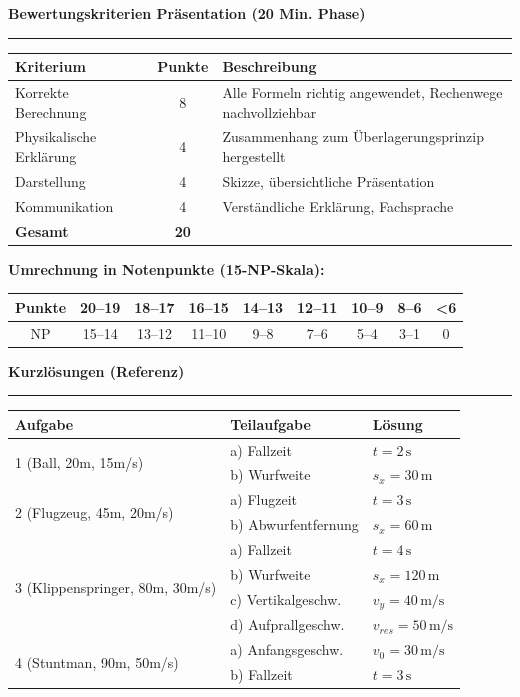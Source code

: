 \documentclass[11pt, a4paper]{article}
\newcommand{\fachfarbe}{physik}
\newcommand{\abschnitt}[1]{%
    \vspace{12pt}
    \noindent\textbf{\large\textcolor{\fachfarbe}{#1}}
    \vspace{6pt}
    \hrule
    \vspace{8pt}
}
\begin{document}

\abschnitt{Bewertungskriterien Präsentation (20 Min. Phase)}

\begin{tabular}{|p{4cm}|c|p{7cm}|}
\hline
\textbf{Kriterium} & \textbf{Punkte} & \textbf{Beschreibung} \\
\hline
Korrekte Berechnung & 8 & Alle Formeln richtig angewendet, Rechenwege nachvollziehbar \\
\hline
Physikalische Erklärung & 4 & Zusammenhang zum Überlagerungsprinzip hergestellt \\
\hline
Darstellung & 4 & Skizze, übersichtliche Präsentation \\
\hline
Kommunikation & 4 & Verständliche Erklärung, Fachsprache \\
\hline
\textbf{Gesamt} & \textbf{20} & \\
\hline
\end{tabular}

\vspace{8pt}

\textbf{Umrechnung in Notenpunkte (15-NP-Skala):}

\begin{tabular}{|c|c|c|c|c|c|c|c|c|}
\hline
Punkte & 20--19 & 18--17 & 16--15 & 14--13 & 12--11 & 10--9 & 8--6 & <6 \\
\hline
NP & 15--14 & 13--12 & 11--10 & 9--8 & 7--6 & 5--4 & 3--1 & 0 \\
\hline
\end{tabular}


\abschnitt{Kurzlösungen (Referenz)}

\renewcommand{\arraystretch}{1.2}
\begin{tabular}{|l|l|l|}
\hline
\textbf{Aufgabe} & \textbf{Teilaufgabe} & \textbf{Lösung} \\
\hline
\multirow{2}{*}{1 (Ball, 20m, 15m/s)} & a) Fallzeit & $t = 2\,\text{s}$ \\
& b) Wurfweite & $s_x = 30\,\text{m}$ \\
\hline
\multirow{2}{*}{2 (Flugzeug, 45m, 20m/s)} & a) Flugzeit & $t = 3\,\text{s}$ \\
& b) Abwurfentfernung & $s_x = 60\,\text{m}$ \\
\hline
\multirow{4}{*}{3 (Klippenspringer, 80m, 30m/s)} & a) Fallzeit & $t = 4\,\text{s}$ \\
& b) Wurfweite & $s_x = 120\,\text{m}$ \\
& c) Vertikalgeschw. & $v_y = 40\,\text{m/s}$ \\
& d) Aufprallgeschw. & $v_{res} = 50\,\text{m/s}$ \\
\hline
\multirow{2}{*}{4 (Stuntman, 90m, 50m/s)} & a) Anfangsgeschw. & $v_0 = 30\,\text{m/s}$ \\
& b) Fallzeit & $t = 3\,\text{s}$ \\
\hline
\end{tabular}
\end{document}
